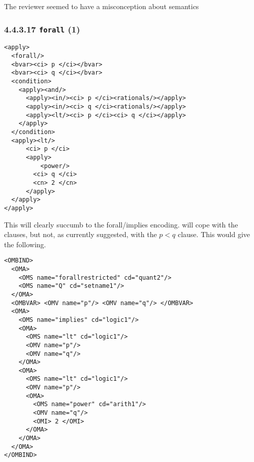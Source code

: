 \documentclass{llncs}
\begin{document}
\begin{newpart}{The reviewer seemed to have a misconception about semantics}
\subsubsection{4.4.3.17 {\tt forall} (1)}\label{443171}
\begin{lstlisting}[language=MathML2]
<apply>
  <forall/>
  <bvar><ci> p </ci></bvar>
  <bvar><ci> q </ci></bvar>
  <condition>
    <apply><and/>
      <apply><in/><ci> p </ci><rationals/></apply>
      <apply><in/><ci> q </ci><rationals/></apply>
      <apply><lt/><ci> p </ci><ci> q </ci></apply>
    </apply>
  </condition>
  <apply><lt/>
      <ci> p </ci>
      <apply>
          <power/>
        <ci> q </ci>
        <cn> 2 </cn>
      </apply>
  </apply>
</apply>
\end{lstlisting}
This will clearly succumb to the forall/implies encoding.
{} will cope with the
{} clauses, but not, as
currently suggested, with the $p<q$ clause. This would give the following.
\begin{lstlisting}
<OMBIND>
  <OMA>
    <OMS name="forallrestricted" cd="quant2"/>
    <OMS name="Q" cd="setname1"/>
  </OMA>
  <OMBVAR> <OMV name="p"/> <OMV name="q"/> </OMBVAR>
  <OMA>
    <OMS name="implies" cd="logic1"/>
    <OMA>
      <OMS name="lt" cd="logic1"/>
      <OMV name="p"/>
      <OMV name="q"/> 
    </OMA>
    <OMA>
      <OMS name="lt" cd="logic1"/>
      <OMV name="p"/>
      <OMA>
        <OMS name="power" cd="arith1"/>
        <OMV name="q"/> 
        <OMI> 2 </OMI>
      </OMA>
    </OMA>
  </OMA>
</OMBIND>
\end{lstlisting}

\end{newpart}
\end{document}
